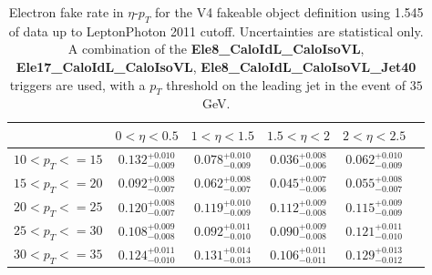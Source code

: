 \begin{table}[!htbp]
\begin{center}
\begin{tabular}{|c|c|c|c|c|c|}

\hline
                       &        $0<\eta<0.5$              &        $1<\eta<1.5$              &        $1.5<\eta<2$              &        $2<\eta<2.5$               \\
\hline
    $10 < p_{T} <= 15$ &        $0.132^{+0.010}_{-0.009}$ &        $0.078^{+0.010}_{-0.009}$ &        $0.036^{+0.008}_{-0.006}$ &        $0.062^{+0.010}_{-0.009}$  \\ 
 \hline
    $15 < p_{T} <= 20$ &        $0.092^{+0.008}_{-0.007}$ &        $0.062^{+0.008}_{-0.007}$ &        $0.045^{+0.007}_{-0.006}$ &        $0.055^{+0.008}_{-0.007}$  \\ 
 \hline
    $20 < p_{T} <= 25$ &        $0.120^{+0.008}_{-0.007}$ &        $0.119^{+0.010}_{-0.009}$ &        $0.112^{+0.009}_{-0.008}$ &        $0.115^{+0.009}_{-0.009}$  \\ 
 \hline
    $25 < p_{T} <= 30$ &        $0.108^{+0.009}_{-0.008}$ &        $0.092^{+0.011}_{-0.010}$ &        $0.090^{+0.009}_{-0.008}$ &        $0.121^{+0.011}_{-0.010}$  \\ 
 \hline
    $30 < p_{T} <= 35$ &        $0.124^{+0.011}_{-0.010}$ &        $0.131^{+0.014}_{-0.013}$ &        $0.106^{+0.011}_{-0.011}$ &        $0.129^{+0.013}_{-0.012}$  \\ 
 \hline


\end{tabular}
\caption{Electron fake rate in $\eta$-$p_T$ for the V4 fakeable object definition using 1.545 \ifb of data up to LeptonPhoton 2011 cutoff. 
Uncertainties are statistical only. A combination of the {\bf Ele8\_CaloIdL\_CaloIsoVL}, {\bf Ele17\_CaloIdL\_CaloIsoVL}, 
{\bf Ele8\_CaloIdL\_CaloIsoVL\_Jet40} triggers are used, with a $p_{T}$ threshold on the leading jet in
the event of $35$ GeV. }
\label{tab:ele_fr_V4_jet35_LP2011}
\end{center}
\end{table}



